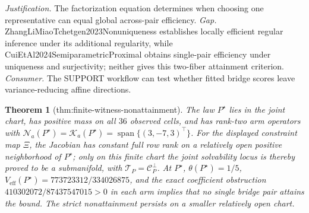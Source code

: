 \documentclass{article}
\newtheorem{theorem}{Theorem}
\begin{document}
\par\smallskip\noindent \textit{Justification.} The factorization equation determines when choosing one representative can equal global across-pair efficiency. \textit{Gap.} ZhangLiMiaoTchetgen2023Nonuniqueness establishes locally efficient regular inference under its additional regularity, while CuiEtAl2024SemiparametricProximal obtains single-pair efficiency under uniqueness and surjectivity; neither gives this two-fiber attainment criterion. \textit{Consumer.} The SUPPORT workflow can test whether fitted bridge scores leave variance-reducing affine directions.

\begin{theorem}[thm:finite-witness-nonattainment]\label{thm:finite-witness-nonattainment}
The law \(P^\star\) lies in the joint chart, has positive mass on all \(36\) observed cells, and has rank-two arm operators with \(\mathcal N_a(P^\star)=\mathcal K_a(P^\star)=\operatorname{span}\{(3,-7,3)^\top\}\). For the displayed constraint map \(\Xi\), the Jacobian has constant full row rank on a relatively open positive neighborhood of \(P^\star\); only on this finite chart the joint solvability locus is thereby proved to be a submanifold, with \(\mathcal T_P=\mathcal C_P^\perp\). At \(P^\star\), \(\theta(P^\star)=1/5\), \(V_{\mathrm{eff}}(P^\star)=773723312/334026875\), and the exact coefficient obstruction \(410302072/87437547015>0\) in each arm implies that no single bridge pair attains the bound. The strict nonattainment persists on a smaller relatively open chart.
\end{theorem}
\end{document}
